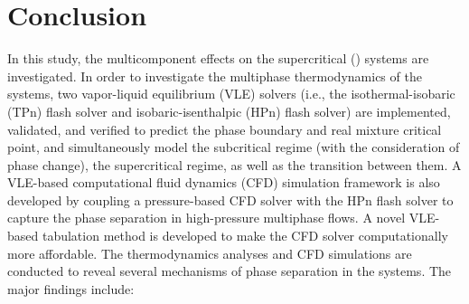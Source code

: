 \section{Conclusion}
\label{sec:conclusion}
In this study, the multicomponent effects on the supercritical  () systems are investigated.
In order to investigate the multiphase thermodynamics of the  systems,
two vapor-liquid equilibrium (VLE) solvers (i.e., the isothermal-isobaric (TPn) flash solver and isobaric-isenthalpic (HPn) flash solver) are implemented, validated, and verified to predict the phase boundary and real mixture critical point, and simultaneously model the subcritical regime (with the consideration of phase change), the supercritical regime, as well as the transition between them. %
A VLE-based computational fluid dynamics (CFD) simulation framework is also developed by coupling a pressure-based CFD solver with the HPn flash solver to capture the phase separation in high-pressure multiphase flows.
A novel VLE-based tabulation method is developed to make the CFD solver computationally more affordable.
The thermodynamics analyses and CFD simulations are conducted to reveal several mechanisms of phase separation in the  systems. %
The major findings include:


